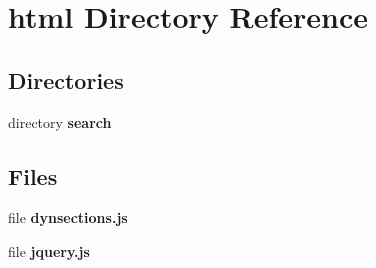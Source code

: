 \section{html Directory Reference}
\label{dir_2dae0a562653f78d59931f0e4b070746}
\subsection*{Directories}
\begin{DoxyCompactItemize}
\item 
directory {\bf search}
\end{DoxyCompactItemize}
\subsection*{Files}
\begin{DoxyCompactItemize}
\item 
file {\bf dynsections.\-js}
\item 
file {\bf jquery.\-js}
\end{DoxyCompactItemize}
